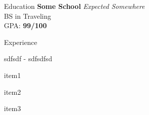 \documentclass{resume}
\begin{document}
\begin{rSection}{Education}
{\bf Some School} \hfill {\em Expected Somewhere}
\\ BS in Traveling
\\ GPA: {\bf 99/100}
\end{rSection}
\begin{rSection}{Experience}
\begin{rSubsection}{sdf}{sdf {-} sdf}{sdf}{sd}
\item item1
\item item2
\item item3
\end{rSubsection}
\end{rSection}
\end{document}
